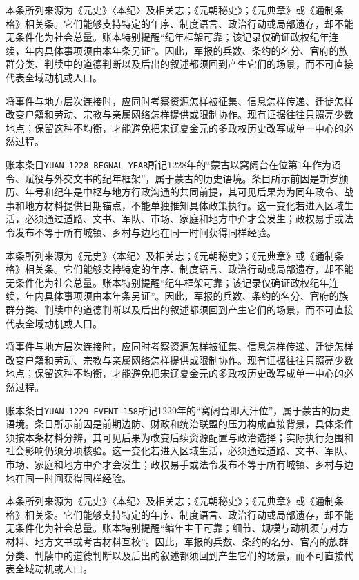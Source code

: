 本条所列来源为《元史》〈本纪〉及相关志；《元朝秘史》；《元典章》或《通制条格》相关条。它们能够支持特定的年序、制度语言、政治行动或局部遗存，却不能无条件化为社会总量。账本特别提醒“纪年框架可靠；该记录仅确证政权纪年连续，年内具体事项须由本年条另证”。因此，军报的兵数、条约的名分、官府的族群分类、判牍中的道德判断以及后出的叙述都须回到产生它们的场景，而不可直接代表全域动机或人口。

将事件与地方层次连接时，应同时考察资源怎样被征集、信息怎样传递、迁徙怎样改变户籍和劳动、宗教与亲属网络怎样提供或限制协作。现有证据往往只照亮少数地点；保留这种不均衡，才能避免把宋辽夏金元的多政权历史改写成单一中心的必然过程。

账本条目\texttt{YUAN-1228-REGNAL-YEAR}所记1228年的“蒙古以窝阔台在位第1年作为诏令、赋役与外交文书的纪年框架”，属于蒙古的历史语境。条目所示前因是新岁颁历、年号和纪年是中枢与地方行政沟通的共同前提，其可见后果为为同年政令、战事和地方材料提供日期锚点，不能单独推知具体政策执行。这一变化若进入区域生活，必须通过道路、文书、军队、市场、家庭和地方中介才会发生；政权易手或法令发布不等于所有城镇、乡村与边地在同一时间获得同样经验。

本条所列来源为《元史》〈本纪〉及相关志；《元朝秘史》；《元典章》或《通制条格》相关条。它们能够支持特定的年序、制度语言、政治行动或局部遗存，却不能无条件化为社会总量。账本特别提醒“纪年框架可靠；该记录仅确证政权纪年连续，年内具体事项须由本年条另证”。因此，军报的兵数、条约的名分、官府的族群分类、判牍中的道德判断以及后出的叙述都须回到产生它们的场景，而不可直接代表全域动机或人口。

将事件与地方层次连接时，应同时考察资源怎样被征集、信息怎样传递、迁徙怎样改变户籍和劳动、宗教与亲属网络怎样提供或限制协作。现有证据往往只照亮少数地点；保留这种不均衡，才能避免把宋辽夏金元的多政权历史改写成单一中心的必然过程。

账本条目\texttt{YUAN-1229-EVENT-158}所记1229年的“窝阔台即大汗位”，属于蒙古的历史语境。条目所示前因是前期边防、财政和统治联盟的压力构成直接背景，具体条件须按本条材料分辨，其可见后果为改变后续资源配置与政治选择；实际执行范围和社会影响仍须分项核验。这一变化若进入区域生活，必须通过道路、文书、军队、市场、家庭和地方中介才会发生；政权易手或法令发布不等于所有城镇、乡村与边地在同一时间获得同样经验。

本条所列来源为《元史》〈本纪〉及相关志；《元朝秘史》；《元典章》或《通制条格》相关条。它们能够支持特定的年序、制度语言、政治行动或局部遗存，却不能无条件化为社会总量。账本特别提醒“编年主干可靠；细节、规模与动机须与对方材料、地方文书或考古材料互校”。因此，军报的兵数、条约的名分、官府的族群分类、判牍中的道德判断以及后出的叙述都须回到产生它们的场景，而不可直接代表全域动机或人口。

